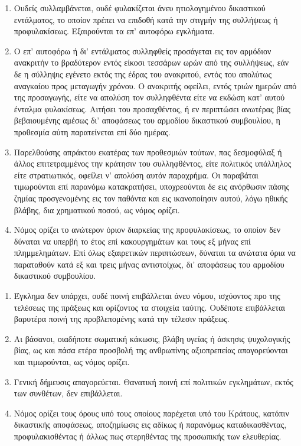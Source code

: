 \documentclass[twoside, a4paper, 10pt]{article}
\begin{document}
\begin{multicols}{2}
\begin{enumerate}
\begin{BigQuote}
\begin{enumerate}
  \item[1.] Ουδείς συλλαμβάνεται, ουδέ φυλακίζεται άνευ ητιολογημένου δικαστικού εντάλματος, το οποίον πρέπει να επιδοθή κατά την στιγμήν της συλλήψεως ή προφυλακίσεως. Εξαιρούνται τα επ' αυτοφόρω εγκλήματα.
  \item[2.] Ο επ' αυτοφόρω ή δι' εντάλματος συλληφθείς προσάγεται εις τον αρμόδιον ανακριτήν το βραδύτερον εντός είκοσι τεσσάρων ωρών από της συλλήψεως, εάν δε η σύλληψις εγένετο εκτός της έδρας του ανακριτού, εντός του απολύτως αναγκαίου προς μεταγωγήν χρόνου. Ο ανακριτής οφείλει, εντός τριών ημερών από της προσαγωγής, είτε να απολύση τον συλληφθέντα είτε να εκδώση κατ' αυτού ένταλμα φυλακίσεως. Αιτήσει του προσαχθέντος, ή εν περιπτώσει ανωτέρας βίας βεβαιουμένης αμέσως δι' αποφάσεως του αρμοδίου δικαστικού συμβουλίου, η προθεσμία αύτη παρατείνεται επί δύο ημέρας.
  \item[3.] Παρελθούσης απράκτου εκατέρας των προθεσμιών τούτων, πας δεσμοφύλαξ ή άλλος επιτετραμμένος την κράτησιν του συλληφθέντος, είτε πολιτικός υπάλληλος είτε στρατιωτικός, οφείλει ν' απολύση αυτόν παραχρήμα. Οι παραβάται τιμωρούνται επί παρανόμω κατακρατήσει, υποχρεούνται δε εις ανόρθωσιν πάσης ζημίας προσγενομένης εις τον παθόντα και εις ικανοποίησιν αυτού, λόγω ηθικής βλάβης, δια χρηματικού ποσού, ως νόμος ορίζει.
  \item[4.] Νόμος ορίζει το ανώτερον όριον διαρκείας της προφυλακίσεως, το οποίον δεν δύναται να υπερβή το έτος επί κακουργημάτων και τους εξ μήνας επί πλημμελημάτων. Επί όλως εξαιρετικών περιπτώσεων, δύναται τα ανώτατα όρια να παραταθούν κατά εξ και τρεις μήνας αντιστοίχως, δι' αποφάσεως του αρμοδίου δικαστικού συμβουλίου.
\end{enumerate}

\begin{enumerate}
  \item[1.] Έγκλημα δεν υπάρχει, ουδέ ποινή επιβάλλεται άνευ νόμου, ισχύοντος προ της τελέσεως της πράξεως και ορίζοντος τα στοιχεία ταύτης. Ουδέποτε επιβάλλεται βαρυτέρα ποινή της προβλεπομένης κατά την τέλεσιν πράξεως.
  \item[2.] Αι βάσανοι, οιαδήποτε σωματική κάκωσις, βλάβη υγείας ή άσκησις ψυχολογικής βίας, ως και πάσα ετέρα προσβολή της ανθρωπίνης αξιοπρεπείας απαγορεύονται και τιμωρούνται, ως νόμος ορίζει.
  \item[3.] Γενική δήμευσις απαγορεύεται. Θανατική ποινή επί πολιτικών εγκλημάτων, εκτός των συνθέτων, δεν επιβάλλεται.
  \item[4.] Νόμος ορίζει τους όρους υπό τους οποίους παρέχεται υπό του Κράτους, κατόπιν δικαστικής αποφάσεως, αποζημίωσις εις αδίκως ή παρανόμως καταδικασθέντας, προφυλακισθέντας ή άλλως πως στερηθέντας της προσωπικής των ελευθερίας.
\end{enumerate}


\end{BigQuote}
\end{enumerate}
\end{multicols}
\end{document}
